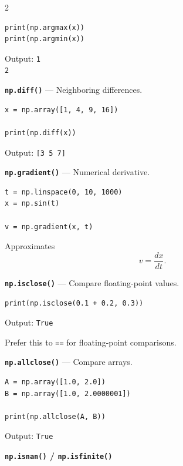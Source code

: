 \documentclass[10pt,a4paper]{article}
\begin{document}
\begin{multicols}{2}
\begin{card}
\begin{lstlisting}[style=pythonstyle]
print(np.argmax(x))
print(np.argmin(x))
\end{lstlisting}

Output:
\texttt{1}\\
\texttt{2}
\end{card}

\begin{card}
\textbf{\texttt{np.diff()}} --- Neighboring differences.

\begin{lstlisting}[style=pythonstyle]
x = np.array([1, 4, 9, 16])

print(np.diff(x))
\end{lstlisting}

Output:
\texttt{[3 5 7]}
\end{card}

\begin{card}
\textbf{\texttt{np.gradient()}} --- Numerical derivative.

\begin{lstlisting}[style=pythonstyle]
t = np.linspace(0, 10, 1000)
x = np.sin(t)

v = np.gradient(x, t)
\end{lstlisting}

Approximates
\[
v=\frac{dx}{dt}.
\]
\end{card}

\begin{card}
\textbf{\texttt{np.isclose()}} --- Compare floating-point values.

\begin{lstlisting}[style=pythonstyle]
print(np.isclose(0.1 + 0.2, 0.3))
\end{lstlisting}

Output: \texttt{True}

Prefer this to \texttt{==} for floating-point comparisons.
\end{card}

\begin{card}
\textbf{\texttt{np.allclose()}} --- Compare arrays.

\begin{lstlisting}[style=pythonstyle]
A = np.array([1.0, 2.0])
B = np.array([1.0, 2.0000001])

print(np.allclose(A, B))
\end{lstlisting}

Output: \texttt{True}
\end{card}

\begin{card}
\textbf{\texttt{np.isnan()} / \texttt{np.isfinite()}}


\end{card}
\end{multicols}
\end{document}
